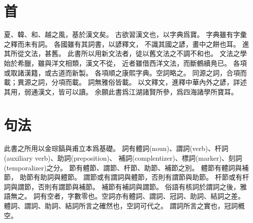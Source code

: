 \chapter*{首}
夏、韓、和、越之風，基於漢文矣。
古欲習漢文也，以字典爲寶。
字典雖有字彙之釋而未有詞。
各國雖有其詞書，以諺釋文，
不識其國之諺，畫中之餅也耳。
進其所從文法，甚舊。
此書所以用新文法者，徒以舊文法之不調不和也。
文法之學始於希臘，雖與洋文相類，漢文不從，
近者雖借西洋文法，而斷鶴續鳧已\parencite{Ahn:2012}。
各項或取諸漢籍，或古道而新製。
各項順之康熙字典。空詞略之。
同源之詞，合項而載；異源之詞，分項而載。
詞無雅俗皆載。
以文釋文，進釋中華內外之諺，詳述其用，弱通漢文，皆可以讀。
余願此書爲江湖諸賢所參，爲四海諸學所寶耳。
\chapter*{句法}
此書之所用以金琮鎬與甫立本爲基礎。
詞有體詞(noun)、謂詞(verb)、杆詞(auxiliary verb)、助詞(preposition)、
補詞(complentizer)、標詞(marker)、刻詞(temporalizer)之分\parencite[43-4]{Pulleyblank:2005}\parencite[2-35]{Kim:2019}。
節有體節、謂節、杆節、助節、補節之別\parencite[15]{Kim:2019}。
體節有體詞與補節，
助節有助詞與體節。
謂節或有謂詞與體節，否則有謂節與助節。
杆節或有杆詞與謂節，否則有謂節與補節。
補節有補詞與謂節。
俗語有核詞於謂詞之後，雅語無之。
詞有空者，字數零也\parencite[2]{Kim:2019}。空詞亦有體詞、謂詞、冠詞、助詞、結詞之差。
體詞、謂詞、助詞、結詞所言之確然也，空詞可代之。
謂詞所言之實也，冠詞槪空。
